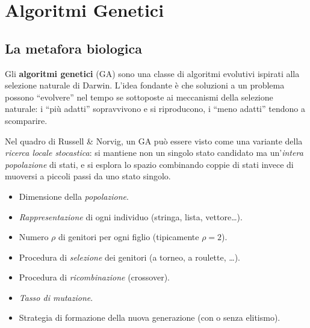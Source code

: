 \documentclass[11pt,a4paper]{article}
\begin{document}
\newpage

\section{Algoritmi Genetici}

\subsection{La metafora biologica}

Gli \textbf{algoritmi genetici} (GA) sono una classe di algoritmi
evolutivi ispirati alla selezione naturale di Darwin. L'idea fondante è
che soluzioni a un problema possono ``evolvere'' nel tempo se sottoposte
ai meccanismi della selezione naturale: i ``più adatti'' sopravvivono e
si riproducono, i ``meno adatti'' tendono a scomparire.

Nel quadro di Russell \& Norvig, un GA può essere visto come una variante
della \emph{ricerca locale stocastica}: si mantiene non un singolo stato
candidato ma un'\emph{intera popolazione} di stati, e si esplora lo spazio
combinando coppie di stati invece di muoversi a piccoli passi da uno
stato singolo.

\begin{concetto}
\begin{itemize}
    \item Dimensione della \emph{popolazione}.
    \item \emph{Rappresentazione} di ogni individuo (stringa, lista, vettore\ldots).
    \item Numero $\rho$ di genitori per ogni figlio (tipicamente $\rho=2$).
    \item Procedura di \emph{selezione} dei genitori (a torneo, a roulette, \ldots).
    \item Procedura di \emph{ricombinazione} (crossover).
    \item \emph{Tasso di mutazione}.
    \item Strategia di formazione della nuova generazione (con o senza elitismo).
\end{itemize}
\end{concetto}

\end{document}
